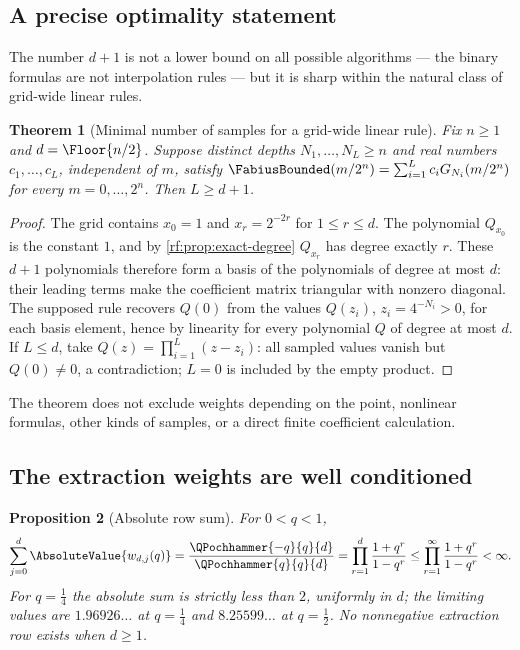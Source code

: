\documentclass[11pt,oneside]{article}
\theoremstyle{plain}
\newtheorem{theorem}{Theorem}[section]
\newtheorem{proposition}[theorem]{Proposition}
\theoremstyle{definition}
\theoremstyle{remark}
\newcommand{\Fb}{\FabiusBounded}            %
\newcommand{\qp}[3]{\QPochhammer{#1}{#2}{#3}}
\begin{document}
\subsection{A precise optimality statement}
\label{rf:sec:extraction-minimal}

The number $d+1$ is not a lower bound on all possible algorithms --- the
binary formulas are not interpolation rules --- but it is sharp within the
natural class of grid-wide linear rules.

\begin{theorem}[Minimal number of samples for a grid-wide linear rule]
\label{rf:thm:extraction-minimal}
Fix $n\ge1$ and $d=\Floor{n/2}$.  Suppose distinct depths
$N_{1},\ldots,N_{L}\ge n$ and real numbers $c_{1},\ldots,c_{L}$, independent
of $m$, satisfy $\Fb(m/2^{n})=\sum_{i=1}^{L}c_{i}G_{N_{i}}(m/2^{n})$ for
every $m=0,\ldots,2^{n}$.  Then $L\ge d+1$.
\end{theorem}

\begin{proof}
The grid contains $x_{0}=1$ and $x_{r}=2^{-2r}$ for $1\le r\le d$.  The
polynomial $Q_{x_{0}}$ is the constant $1$, and by
\cref{rf:prop:exact-degree} $Q_{x_{r}}$ has degree exactly $r$.  These
$d+1$ polynomials therefore form a basis of the polynomials of degree at
most $d$: their leading terms make the coefficient matrix triangular with
nonzero diagonal.  The supposed rule recovers $Q(0)$ from the values
$Q(z_{i})$, $z_{i}=4^{-N_{i}}>0$, for each basis element, hence by
linearity for every polynomial $Q$ of degree at most $d$.  If $L\le d$,
take $Q(z)=\prod_{i=1}^{L}(z-z_{i})$: all sampled values vanish but
$Q(0)\neq0$, a contradiction; $L=0$ is included by the empty product.
\end{proof}

The theorem does not exclude weights depending on the point, nonlinear
formulas, other kinds of samples, or a direct finite coefficient
calculation.

\subsection{The extraction weights are well conditioned}
\label{rf:sec:extraction-stability}

\begin{proposition}[Absolute row sum]
\label{rf:prop:extraction-norm}
For $0<q<1$,
\begin{equation}
 \sum_{j=0}^{d}\AbsoluteValue{w_{d,j}(q)}
 =\frac{\qp{-q}{q}{d}}{\qp{q}{q}{d}}
 =\prod_{r=1}^{d}\frac{1+q^{r}}{1-q^{r}}
 \le\prod_{r=1}^{\infty}\frac{1+q^{r}}{1-q^{r}}<\infty.
 \label{rf:eq:extraction-norm}
\end{equation}
For $q=\tfrac14$ the absolute sum is strictly less than $2$, uniformly in
$d$; the limiting values are $1.96926\ldots$ at $q=\tfrac14$ and
$8.25599\ldots$ at $q=\tfrac12$.  No nonnegative extraction row exists when
$d\ge1$.
\end{proposition}
\end{document}

